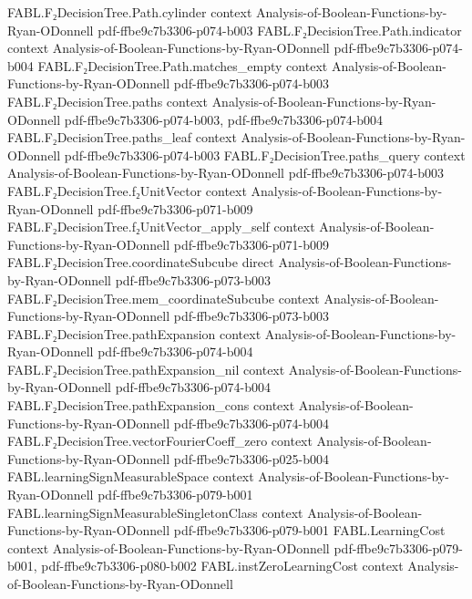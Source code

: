 \begin{theorem}
\proofstep
  {FABL.F₂DecisionTree.Path.cylinder}
  {context}
  {Analysis-of-Boolean-Functions-by-Ryan-ODonnell}
  {pdf-ffbe9c7b3306-p074-b003}
\proofstep
  {FABL.F₂DecisionTree.Path.indicator}
  {context}
  {Analysis-of-Boolean-Functions-by-Ryan-ODonnell}
  {pdf-ffbe9c7b3306-p074-b004}
\proofstep
  {FABL.F₂DecisionTree.Path.matches_empty}
  {context}
  {Analysis-of-Boolean-Functions-by-Ryan-ODonnell}
  {pdf-ffbe9c7b3306-p074-b003}
\proofstep
  {FABL.F₂DecisionTree.paths}
  {context}
  {Analysis-of-Boolean-Functions-by-Ryan-ODonnell}
  {pdf-ffbe9c7b3306-p074-b003,
    pdf-ffbe9c7b3306-p074-b004}
\proofstep
  {FABL.F₂DecisionTree.paths_leaf}
  {context}
  {Analysis-of-Boolean-Functions-by-Ryan-ODonnell}
  {pdf-ffbe9c7b3306-p074-b003}
\proofstep
  {FABL.F₂DecisionTree.paths_query}
  {context}
  {Analysis-of-Boolean-Functions-by-Ryan-ODonnell}
  {pdf-ffbe9c7b3306-p074-b003}
\proofstep
  {FABL.F₂DecisionTree.f₂UnitVector}
  {context}
  {Analysis-of-Boolean-Functions-by-Ryan-ODonnell}
  {pdf-ffbe9c7b3306-p071-b009}
\proofstep
  {FABL.F₂DecisionTree.f₂UnitVector_apply_self}
  {context}
  {Analysis-of-Boolean-Functions-by-Ryan-ODonnell}
  {pdf-ffbe9c7b3306-p071-b009}
\proofstep
  {FABL.F₂DecisionTree.coordinateSubcube}
  {direct}
  {Analysis-of-Boolean-Functions-by-Ryan-ODonnell}
  {pdf-ffbe9c7b3306-p073-b003}
\proofstep
  {FABL.F₂DecisionTree.mem_coordinateSubcube}
  {context}
  {Analysis-of-Boolean-Functions-by-Ryan-ODonnell}
  {pdf-ffbe9c7b3306-p073-b003}
\proofstep
  {FABL.F₂DecisionTree.pathExpansion}
  {context}
  {Analysis-of-Boolean-Functions-by-Ryan-ODonnell}
  {pdf-ffbe9c7b3306-p074-b004}
\proofstep
  {FABL.F₂DecisionTree.pathExpansion_nil}
  {context}
  {Analysis-of-Boolean-Functions-by-Ryan-ODonnell}
  {pdf-ffbe9c7b3306-p074-b004}
\proofstep
  {FABL.F₂DecisionTree.pathExpansion_cons}
  {context}
  {Analysis-of-Boolean-Functions-by-Ryan-ODonnell}
  {pdf-ffbe9c7b3306-p074-b004}
\proofstep
  {FABL.F₂DecisionTree.vectorFourierCoeff_zero}
  {context}
  {Analysis-of-Boolean-Functions-by-Ryan-ODonnell}
  {pdf-ffbe9c7b3306-p025-b004}
\proofstep
  {FABL.learningSignMeasurableSpace}
  {context}
  {Analysis-of-Boolean-Functions-by-Ryan-ODonnell}
  {pdf-ffbe9c7b3306-p079-b001}
\proofstep
  {FABL.learningSignMeasurableSingletonClass}
  {context}
  {Analysis-of-Boolean-Functions-by-Ryan-ODonnell}
  {pdf-ffbe9c7b3306-p079-b001}
\proofstep
  {FABL.LearningCost}
  {context}
  {Analysis-of-Boolean-Functions-by-Ryan-ODonnell}
  {pdf-ffbe9c7b3306-p079-b001,
    pdf-ffbe9c7b3306-p080-b002}
\proofstep
  {FABL.instZeroLearningCost}
  {context}
  {Analysis-of-Boolean-Functions-by-Ryan-ODonnell}

\end{theorem}
